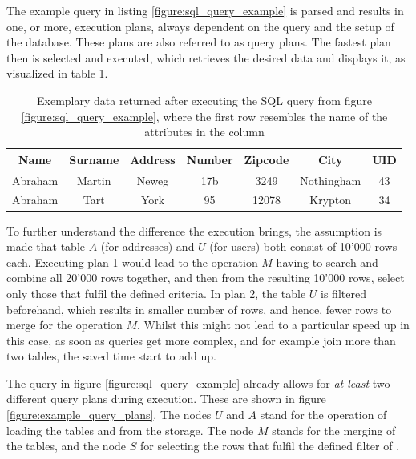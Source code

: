 The example query in listing \ref{figure:sql_query_example} is parsed and results in one, or more, execution plans\cite{microsoft_execution_nodate}, always dependent on the query and the setup of the database. These plans are also referred to as query plans. The fastest plan then is selected and executed, which retrieves the desired data and displays it, as visualized in table \ref{table:sql_query_result_example}.

\begin{table}[!h]
    \centering
    \begin{tabular}{|c|c|c|c|c|c|c|}
        \hline
        Name    & Surname  & Address & Number & Zipcode & City & UID\\ \hline
        Abraham & Martin   & Neweg & 17b & 3249 & Nothingham & 43\\ \hline
        Abraham & Tart     & York & 95 & 12078 & Krypton & 34    \\ \hline
    \end{tabular}
    \caption{Exemplary data returned after executing the SQL query from figure \ref{figure:sql_query_example}, where the first row resembles the name of the attributes in the column}
    \label{table:sql_query_result_example}
\end{table}

To further understand the difference the execution brings, the assumption is made that table $A$ (for addresses) and $U$ (for users) both consist of 10'000 rows each.  Executing plan 1 would lead to the operation $M$ having to search and combine all 20'000 rows together, and then from the resulting 10'000 rows, select only those that fulfil the defined criteria. In plan 2, the table $U$ is filtered beforehand, which results in smaller number of rows, and hence, fewer rows to merge for the operation $M$. Whilst this might not lead to a particular speed up in this case, as soon as queries get more complex, and for example join more than two tables, the saved time start to add up.\par
The query in figure \ref{figure:sql_query_example} already allows for \emph{at least} two different query plans during execution. These are shown in figure \ref{figure:example_query_plans}. The nodes $U$ and $A$ stand for the operation of loading the tables  and  from the storage. The node $M$ stands for the merging of the tables, and the node $S$ for selecting the rows that fulfil the defined filter of .

